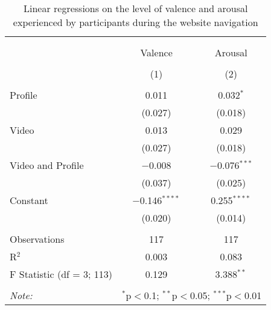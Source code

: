 
\begin{table}[H] \centering 
  \caption{ Linear regressions on the level of valence and arousal experienced by participants during the website navigation} 
  \label{tbl:arousal} 
\begin{tabular}{@{\extracolsep{5pt}}lcc} 
\\[-1.8ex]\hline 
\hline \\[-1.8ex] 
\\[-1.8ex] & Valence & Arousal \\ 
\\[-1.8ex] & (1) & (2)\\ 
\hline \\[-1.8ex] 
 Profile & 0.011 & 0.032$^{*}$ \\ 
  & (0.027) & (0.018) \\ 
  Video & 0.013 & 0.029 \\ 
  & (0.027) & (0.018) \\ 
  Video and Profile & $-$0.008 & $-$0.076$^{***}$ \\ 
  & (0.037) & (0.025) \\ 
  Constant & $-$0.146$^{****}$ & 0.255$^{****}$ \\ 
  & (0.020) & (0.014) \\ 
 \hline \\[-1.8ex] 
Observations & 117 & 117 \\ 
R$^{2}$ & 0.003 & 0.083 \\ 
F Statistic (df = 3; 113) & 0.129 & 3.388$^{**}$ \\ 
\hline 
\hline \\[-1.8ex] 
\textit{Note:}  & \multicolumn{2}{l}{$^{*}$p$<$0.1; $^{**}$p$<$0.05; $^{***}$p$<$0.01} \\ 
\end{tabular} 
\end{table} 
